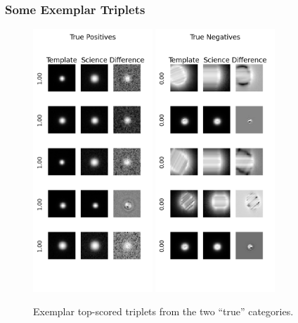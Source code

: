 \documentclass[DM,authoryear,toc]{lsstdoc}
\begin{document}
\clearpage
\subsubsection{Some Exemplar Triplets}
\begin{figure}[h]
  \centering
  \includegraphics[width=0.4\textwidth]{TP_13-resnet50-FullAugmentation-scratch-B64_epoch0000095_iter0255000__npy_data_0.1.2-0sigma_256by256__posw_1.png}
  \includegraphics[width=0.4\textwidth]{TN_13-resnet50-FullAugmentation-scratch-B64_epoch0000095_iter0255000__npy_data_0.1.2-0sigma_256by256__posw_1.png}
  \caption{Exemplar top-scored triplets from the two ``true'' categories.}
  \label{fig:tract_templates}
\end{figure}
\end{document}
